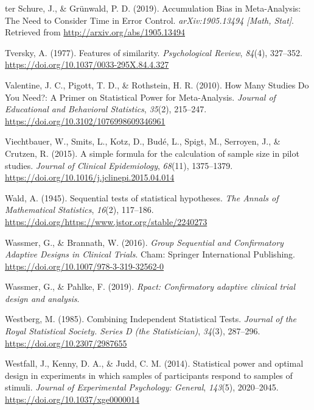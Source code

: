 \documentclass[
  english,
  ,jou, a4paper,floatsintext]{apa6}
\newlength{\cslhangindent}
\newenvironment{cslreferences}%
  {\setlength{\parindent}{0pt}%
  \everypar{\setlength{\hangindent}{\cslhangindent}}\ignorespaces}%
  {\par}
\begin{document}
\begin{cslreferences}
\leavevmode\hypertarget{ref-ter_schure_accumulation_2019}{}%
ter Schure, J., \& Grünwald, P. D. (2019). Accumulation Bias in Meta-Analysis: The Need to Consider Time in Error Control. \emph{arXiv:1905.13494 {[}Math, Stat{]}}. Retrieved from \url{http://arxiv.org/abs/1905.13494}

\leavevmode\hypertarget{ref-tversky_features_1977}{}%
Tversky, A. (1977). Features of similarity. \emph{Psychological Review}, \emph{84}(4), 327--352. \url{https://doi.org/10.1037/0033-295X.84.4.327}

\leavevmode\hypertarget{ref-valentine_how_2010}{}%
Valentine, J. C., Pigott, T. D., \& Rothstein, H. R. (2010). How Many Studies Do You Need?: A Primer on Statistical Power for Meta-Analysis. \emph{Journal of Educational and Behavioral Statistics}, \emph{35}(2), 215--247. \url{https://doi.org/10.3102/1076998609346961}

\leavevmode\hypertarget{ref-viechtbauer_simple_2015}{}%
Viechtbauer, W., Smits, L., Kotz, D., Budé, L., Spigt, M., Serroyen, J., \& Crutzen, R. (2015). A simple formula for the calculation of sample size in pilot studies. \emph{Journal of Clinical Epidemiology}, \emph{68}(11), 1375--1379. \url{https://doi.org/10.1016/j.jclinepi.2015.04.014}

\leavevmode\hypertarget{ref-wald_sequential_1945}{}%
Wald, A. (1945). Sequential tests of statistical hypotheses. \emph{The Annals of Mathematical Statistics}, \emph{16}(2), 117--186. \url{https://doi.org/https://www.jstor.org/stable/2240273}

\leavevmode\hypertarget{ref-wassmer_group_2016}{}%
Wassmer, G., \& Brannath, W. (2016). \emph{Group Sequential and Confirmatory Adaptive Designs in Clinical Trials}. Cham: Springer International Publishing. \url{https://doi.org/10.1007/978-3-319-32562-0}

\leavevmode\hypertarget{ref-wassmer_rpact_2019}{}%
Wassmer, G., \& Pahlke, F. (2019). \emph{Rpact: Confirmatory adaptive clinical trial design and analysis}.

\leavevmode\hypertarget{ref-westberg_combining_1985}{}%
Westberg, M. (1985). Combining Independent Statistical Tests. \emph{Journal of the Royal Statistical Society. Series D (the Statistician)}, \emph{34}(3), 287--296. \url{https://doi.org/10.2307/2987655}

\leavevmode\hypertarget{ref-westfall_statistical_2014}{}%
Westfall, J., Kenny, D. A., \& Judd, C. M. (2014). Statistical power and optimal design in experiments in which samples of participants respond to samples of stimuli. \emph{Journal of Experimental Psychology: General}, \emph{143}(5), 2020--2045. \url{https://doi.org/10.1037/xge0000014}


\end{cslreferences}
\end{document}

